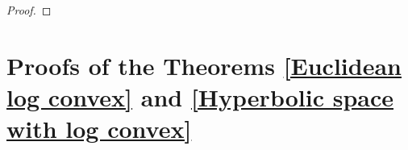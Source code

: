 \documentclass[11pt,leqno]{amsart}
\numberwithin{equation}{section}
\begin{document}
\begin{proof}


\end{proof}


\section{Proofs of the Theorems \ref{Euclidean log convex} and \ref{Hyperbolic space with log convex}}\label{sect5}
\end{document}
